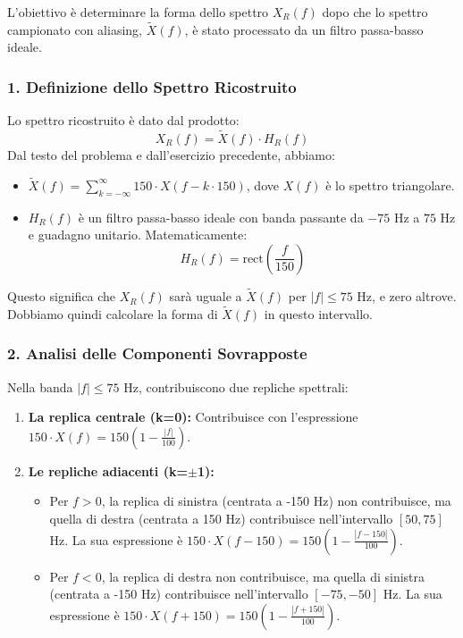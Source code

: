 
\begin{soluzione}{7}
    L'obiettivo è determinare la forma dello spettro $X_R(f)$ dopo che lo spettro campionato con aliasing, $\tilde{X}(f)$, è stato processato da un filtro passa-basso ideale.
    
    \subsubsection*{1. Definizione dello Spettro Ricostruito}
    Lo spettro ricostruito è dato dal prodotto:
    \[
        X_R(f) = \tilde{X}(f) \cdot H_R(f)
    \]
    Dal testo del problema e dall'esercizio precedente, abbiamo:
    \begin{itemize}
        \item $\tilde{X}(f) = \sum_{k=-\infty}^{\infty} 150 \cdot X(f - k \cdot 150)$, dove $X(f)$ è lo spettro triangolare.
        \item $H_R(f)$ è un filtro passa-basso ideale con banda passante da $-75$ Hz a $75$ Hz e guadagno unitario. Matematicamente:
        \[
             H_R(f) = \text{rect}\left(\frac{f}{150}\right)
        \]
    \end{itemize}
    Questo significa che $X_R(f)$ sarà uguale a $\tilde{X}(f)$ per $|f| \le 75$ Hz, e zero altrove. Dobbiamo quindi calcolare la forma di $\tilde{X}(f)$ in questo intervallo.

    \subsubsection*{2. Analisi delle Componenti Sovrapposte}
    Nella banda $|f| \le 75$ Hz, contribuiscono due repliche spettrali:
    \begin{enumerate}
        \item \textbf{La replica centrale (k=0):} Contribuisce con l'espressione $150 \cdot X(f) = 150 \left(1 - \frac{|f|}{100}\right)$.
        \item \textbf{Le repliche adiacenti (k=$\pm$1):} 
            \begin{itemize}
                \item Per $f > 0$, la replica di sinistra (centrata a -150 Hz) non contribuisce, ma quella di destra (centrata a 150 Hz) contribuisce nell'intervallo $[50, 75]$ Hz. La sua espressione è $150 \cdot X(f-150) = 150 \left(1 - \frac{|f-150|}{100}\right)$.
                \item Per $f < 0$, la replica di destra non contribuisce, ma quella di sinistra (centrata a -150 Hz) contribuisce nell'intervallo $[-75, -50]$ Hz. La sua espressione è $150 \cdot X(f+150) = 150 \left(1 - \frac{|f+150|}{100}\right)$.
            \end{itemize}
    \end{enumerate}
    

\end{soluzione}
